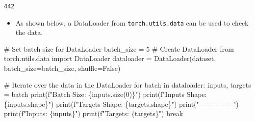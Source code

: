 \documentclass[
  letterpaper,
  DIV=11,
  numbers=noendperiod]{scrreprt}
\newenvironment{Shaded}{\begin{snugshade}}{\end{snugshade}}
\newcommand{\BuiltInTok}[1]{\textcolor[rgb]{0.00,0.23,0.31}{#1}}
\newcommand{\CommentTok}[1]{\textcolor[rgb]{0.37,0.37,0.37}{#1}}
\newcommand{\ControlFlowTok}[1]{\textcolor[rgb]{0.00,0.23,0.31}{#1}}
\newcommand{\DecValTok}[1]{\textcolor[rgb]{0.68,0.00,0.00}{#1}}
\newcommand{\ImportTok}[1]{\textcolor[rgb]{0.00,0.46,0.62}{#1}}
\newcommand{\KeywordTok}[1]{\textcolor[rgb]{0.00,0.23,0.31}{#1}}
\newcommand{\NormalTok}[1]{\textcolor[rgb]{0.00,0.23,0.31}{#1}}
\newcommand{\OperatorTok}[1]{\textcolor[rgb]{0.37,0.37,0.37}{#1}}
\newcommand{\SpecialCharTok}[1]{\textcolor[rgb]{0.37,0.37,0.37}{#1}}
\newcommand{\SpecialStringTok}[1]{\textcolor[rgb]{0.13,0.47,0.30}{#1}}
\newcommand{\StringTok}[1]{\textcolor[rgb]{0.13,0.47,0.30}{#1}}
\newcommand{\VariableTok}[1]{\textcolor[rgb]{0.07,0.07,0.07}{#1}}
\providecommand{\tightlist}{%
  \setlength{\itemsep}{0pt}\setlength{\parskip}{0pt}}\usepackage{longtable,booktabs,array}
\begin{document}
\begin{verbatim}
442
\end{verbatim}

\begin{tcolorbox}[enhanced jigsaw, coltitle=black, bottomrule=.15mm, breakable, toprule=.15mm, colframe=quarto-callout-note-color-frame, title=\textcolor{quarto-callout-note-color}{\faInfo}\hspace{0.5em}{Note: Data Set and Data Loader}, colbacktitle=quarto-callout-note-color!10!white, opacityback=0, left=2mm, leftrule=.75mm, colback=white, rightrule=.15mm, bottomtitle=1mm, toptitle=1mm, titlerule=0mm, arc=.35mm, opacitybacktitle=0.6]

\begin{itemize}
\tightlist
\item
  As shown below, a DataLoader from \texttt{torch.utils.data} can be
  used to check the data.
\end{itemize}

\begin{Shaded}
\begin{Highlighting}[]
\CommentTok{\# Set batch size for DataLoader}
\NormalTok{batch\_size }\OperatorTok{=} \DecValTok{5}
\CommentTok{\# Create DataLoader}
\ImportTok{from}\NormalTok{ torch.utils.data }\ImportTok{import}\NormalTok{ DataLoader}
\NormalTok{dataloader }\OperatorTok{=}\NormalTok{ DataLoader(dataset, batch\_size}\OperatorTok{=}\NormalTok{batch\_size, shuffle}\OperatorTok{=}\VariableTok{False}\NormalTok{)}

\CommentTok{\# Iterate over the data in the DataLoader}
\ControlFlowTok{for}\NormalTok{ batch }\KeywordTok{in}\NormalTok{ dataloader:}
\NormalTok{    inputs, targets }\OperatorTok{=}\NormalTok{ batch}
    \BuiltInTok{print}\NormalTok{(}\SpecialStringTok{f"Batch Size: }\SpecialCharTok{\{}\NormalTok{inputs}\SpecialCharTok{.}\NormalTok{size(}\DecValTok{0}\NormalTok{)}\SpecialCharTok{\}}\SpecialStringTok{"}\NormalTok{)}
    \BuiltInTok{print}\NormalTok{(}\SpecialStringTok{f"Inputs Shape: }\SpecialCharTok{\{}\NormalTok{inputs}\SpecialCharTok{.}\NormalTok{shape}\SpecialCharTok{\}}\SpecialStringTok{"}\NormalTok{)}
    \BuiltInTok{print}\NormalTok{(}\SpecialStringTok{f"Targets Shape: }\SpecialCharTok{\{}\NormalTok{targets}\SpecialCharTok{.}\NormalTok{shape}\SpecialCharTok{\}}\SpecialStringTok{"}\NormalTok{)}
    \BuiltInTok{print}\NormalTok{(}\StringTok{"{-}{-}{-}{-}{-}{-}{-}{-}{-}{-}{-}{-}{-}{-}{-}"}\NormalTok{)}
    \BuiltInTok{print}\NormalTok{(}\SpecialStringTok{f"Inputs: }\SpecialCharTok{\{}\NormalTok{inputs}\SpecialCharTok{\}}\SpecialStringTok{"}\NormalTok{)}
    \BuiltInTok{print}\NormalTok{(}\SpecialStringTok{f"Targets: }\SpecialCharTok{\{}\NormalTok{targets}\SpecialCharTok{\}}\SpecialStringTok{"}\NormalTok{)}
    \ControlFlowTok{break}
\end{Highlighting}
\end{Shaded}


\end{tcolorbox}
\end{document}
